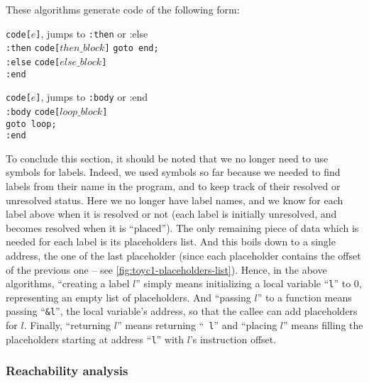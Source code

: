 \noindent These algorithms generate code of the following form:
\begin{Paragraph}
\begin{paracol}{2}
\noindent {} {\tt code[$e$]}, jumps to {\tt :then} or
{:else}\\
{\tt :then} {\tt code[$then\_block$]} {\tt goto end;}\\
{\tt :else} {\tt code[$else\_block$]}\\
{\tt :end}

\switchcolumn

 {\tt code[$e$]}, jumps to {\tt :body} or {:end}\\
{\tt :body} {\tt code[$loop\_block$]}\\
{\phantom {\tt :body}} {\tt goto loop;}\\
{\tt :end}
\end{paracol}
\end{Paragraph}

To conclude this section, it should be noted that we no longer need to use
symbols for labels. Indeed, we used symbols so far because we needed to find
labels from their name in the program, and to keep track of their resolved or
unresolved status. Here we no longer have label names, and we know for each
label above when it is resolved or not (each label is initially unresolved, and
becomes resolved when it is ``placed''). The only remaining piece of data which
is needed for each label is its placeholders list. And this boils down to a
single address, the one of the last placeholder (since each placeholder
contains the offset of the previous one -- see
\cref{fig:toyc1-placeholders-list}). Hence, in the above algorithms, ``creating
a label $l$'' simply means initializing a local variable ``{\tt l}'' to 0,
representing an empty list of placeholders. And ``passing $l$'' to a function
means passing ``{\tt \&l}'', the local variable's address, so that the callee
can add placeholders for $l$. Finally, ``returning $l$'' means returning ``{\tt
l}'' and ``placing $l$'' means filling the placeholders starting at address
``{\tt l}'' with $l$'s instruction offset.

\subsubsection{Reachability analysis}\label{subsubsection:toyc3-reachability}

